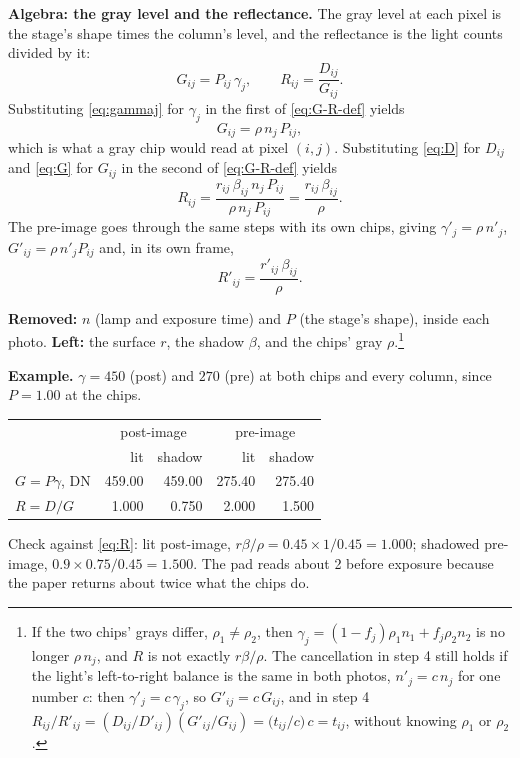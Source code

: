 \documentclass[11pt,letter]{article}
\begin{document}
\textbf{Algebra: the gray level and the reflectance.}  The gray level
at each pixel is the stage's shape times the column's level, and the
reflectance is the light counts divided by it:
\begin{equation}
  G_{ij} = P_{ij}\, \gamma_j , \qquad
  R_{ij} = \frac{D_{ij}}{G_{ij}} .
  \label{eq:G-R-def}
\end{equation}
Substituting \eqref{eq:gammaj} for $\gamma_j$ in the first of
\eqref{eq:G-R-def} yields
\begin{equation}
  G_{ij} = \rho\, n_j\, P_{ij} ,
  \label{eq:G}
\end{equation}
which is what a gray chip would read at pixel $(i, j)$.  Substituting
\eqref{eq:D} for $D_{ij}$ and \eqref{eq:G} for $G_{ij}$ in the second of
\eqref{eq:G-R-def} yields
\begin{equation}
  R_{ij} = \frac{r_{ij}\, \beta_{ij}\, n_j\, P_{ij}}{\rho\, n_j\, P_{ij}}
         = \frac{r_{ij}\, \beta_{ij}}{\rho} .
  \label{eq:R}
\end{equation}
The pre-image goes through the same steps with its own chips, giving
$\gamma'_j = \rho\, n'_j$, $G'_{ij} = \rho\, n'_j P_{ij}$ and, in its own
frame,
\begin{equation}
  R'_{ij} = \frac{r'_{ij}\, \beta_{ij}}{\rho} .
  \label{eq:Rpre}
\end{equation}

\textbf{Removed:} $n$ (lamp and exposure time) and $P$ (the stage's shape),
inside each photo.  \textbf{Left:} the surface $r$, the shadow $\beta$, and
the chips' gray $\rho$.\footnote{If the two chips' grays differ, $\rho_1
\ne \rho_2$, then $\gamma_j = (1 - f_j)\rho_1 n_1 + f_j \rho_2 n_2$ is no
longer $\rho\, n_j$, and $R$ is not exactly $r \beta / \rho$.  The
cancellation in step 4 still holds if the light's left-to-right balance is
the same in both photos, $n'_j = c\, n_j$ for one number $c$: then
$\gamma'_j = c\, \gamma_j$, so $G'_{ij} = c\, G_{ij}$, and in step 4
$R_{ij}/R'_{ij} = (D_{ij}/D'_{ij})(G'_{ij}/G_{ij})
= \bigl(t_{ij}/c\bigr)\, c = t_{ij}$, without knowing $\rho_1$ or
$\rho_2$.}

\textbf{Example.}  $\gamma = 450$ (post) and $270$ (pre) at both chips and
every column, since $P = 1.00$ at the chips.

\medskip
\begin{center}
\begin{tabular}{@{}lrrrr@{}}
\toprule
 & \multicolumn{2}{c}{post-image} & \multicolumn{2}{c}{pre-image} \\
 & lit & shadow & lit & shadow \\
\midrule
$G = P\gamma$, DN & 459.00 & 459.00 & 275.40 & 275.40 \\
$R = D/G$         & 1.000  & 0.750  & 2.000  & 1.500 \\
\bottomrule
\end{tabular}
\end{center}
\noindent Check against \eqref{eq:R}: lit post-image,
$r \beta/\rho = 0.45 \times 1 / 0.45 = 1.000$; shadowed pre-image,
$0.9 \times 0.75 / 0.45 = 1.500$.  The pad reads about 2 before exposure
because the paper returns about twice what the chips do.
\end{document}
